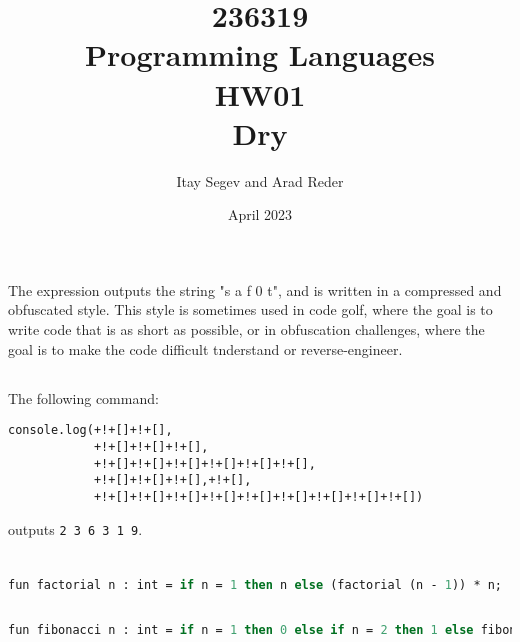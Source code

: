 \documentclass{article}
\title{%
       236319 \\
       Programming Languages \\
       \large HW01 \\
       \small Dry}
\author{Itay Segev and Arad Reder}
\date{April 2023}
\begin{document}
\maketitle

\section{}
\subsection{}
The expression outputs the string "s a f 0 t", and is written in a compressed and obfuscated style. This style is sometimes used in code
golf, where the goal is to write code that is as short as possible, or in obfuscation challenges, where the goal is to make the code difficult
tnderstand or reverse-engineer.
\subsection{}
The following command:
\begin{lstlisting}
console.log(+!+[]+!+[],
            +!+[]+!+[]+!+[],
            +!+[]+!+[]+!+[]+!+[]+!+[]+!+[],
            +!+[]+!+[]+!+[],+!+[],
            +!+[]+!+[]+!+[]+!+[]+!+[]+!+[]+!+[]+!+[]+!+[])
\end{lstlisting}
outputs \lstinline{2 3 6 3 1 9}.

\section{}
\subsection{}
\begin{lstlisting}[language=Pascal]
fun factorial n : int = if n = 1 then n else (factorial (n - 1)) * n;
\end{lstlisting}

\subsection{}
\begin{lstlisting}[language=Pascal]
fun fibonacci n : int = if n = 1 then 0 else if n = 2 then 1 else fibonacci(n - 1) + fibonacci(n - 2);
\end{lstlisting}

\section{}
\end{document}
